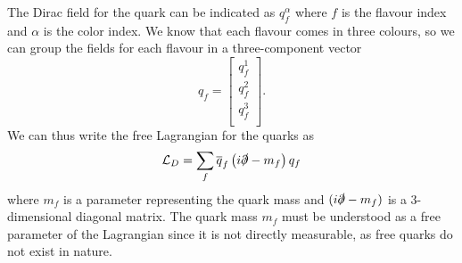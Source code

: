 \documentclass[10pt,a4paper]{book}
\begin{document}
The Dirac field for the quark can be indicated as $q_f^\alpha$ where $f$ is the flavour index and $\alpha$ is the color index. We know that each flavour comes in three colours, so we can group the fields for each flavour in a three-component vector
\begin{equation}
q_f = 	\begin{bmatrix} 	
		q^1_f \\ 
		q^2_f \\
		q^3_f \\
		\end{bmatrix}.
\end{equation}
We can thus write the free Lagrangian for the quarks as 
\begin{equation}
\mathcal{L}_D = \sum_f\overline{q}_f\left(i\slashed{\partial} - m_f\right)q_f
\end{equation}
where $m_f$ is a parameter representing the quark mass and $(i\slashed{\partial} - m_f)$ is a 3-dimensional diagonal matrix. The quark mass $m_f$ must be understood as a free parameter of the Lagrangian since it is not directly measurable, as free quarks do not exist in nature.
\end{document}
